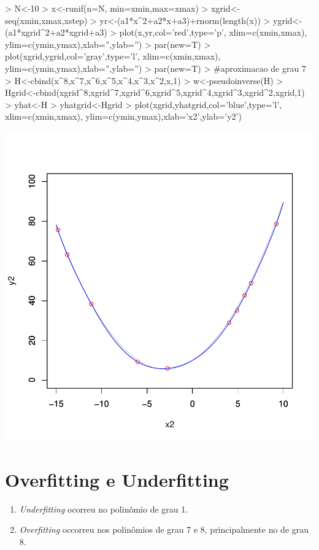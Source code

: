 \documentclass{article}
\begin{document}
\begin{Schunk}
\begin{Sinput}
>   N<-10
>   x<-runif(n=N, min=xmin,max=xmax)
>   xgrid<-seq(xmin,xmax,xstep)
>   yr<-(a1*x^2+a2*x+a3)+rnorm(length(x))
>   ygrid<-(a1*xgrid^2+a2*xgrid+a3)
>   plot(x,yr,col='red',type='p', xlim=c(xmin,xmax), ylim=c(ymin,ymax),xlab='',ylab='')
>   par(new=T)
>   plot(xgrid,ygrid,col='gray',type='l', xlim=c(xmin,xmax), ylim=c(ymin,ymax),xlab='',ylab='')
>   par(new=T)
>   #aproximacao de grau 7
>   H<-cbind(x^8,x^7,x^6,x^5,x^4,x^3,x^2,x,1)
>   w<-pseudoinverse(H) %
>   Hgrid<-cbind(xgrid^8,xgrid^7,xgrid^6,xgrid^5,xgrid^4,xgrid^3,xgrid^2,xgrid,1)
>   yhat<-H%
>   yhatgrid<-Hgrid%
>   plot(xgrid,yhatgrid,col='blue',type='l', xlim=c(xmin,xmax), ylim=c(ymin,ymax),xlab='x2',ylab='y2')
\end{Sinput}
\end{Schunk}
\includegraphics{aproximacao_polinomial-009}

\newpage
\section{Overfitting e Underfitting}

\begin{enumerate}
  \item \emph{Underfitting} ocorreu no polinômio de grau 1.
  \item \emph{Overfitting} occorreu nos polinômios de grau 7 e 8, principalmente no de grau 8.
\end{enumerate}
\end{document}

